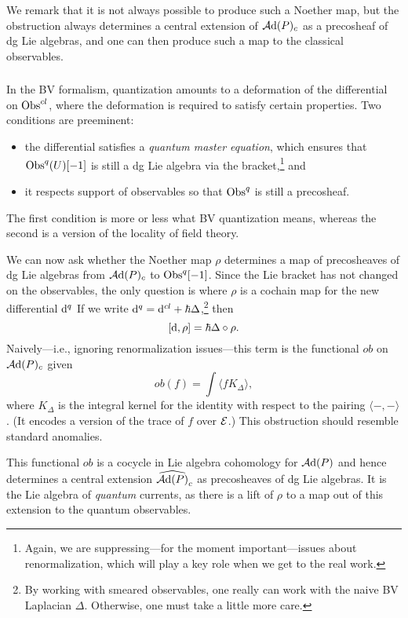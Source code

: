 \begin{rmk}
We remark that it is not always possible to produce such a Noether map,
but the obstruction always determines a central extension of $\mathcal A{\rm d}(P)_c$ as a precosheaf of dg Lie algebras,
and one can then produce such a map to the classical observables.
\end{rmk}

\subsubsection{}

In the BV formalism, quantization amounts to a deformation of the differential on ${\rm Obs}^{cl}$,
where the deformation is required to satisfy certain properties.
Two conditions are preeminent:
\begin{itemize}
\item the differential satisfies a {\em quantum master equation}, which ensures that ${\rm Obs}^q(U)[-1]$ is still a dg Lie algebra via the bracket,\footnote{Again, we are suppressing---for the moment important---issues about renormalization, which will play a key role when we get to the real work.} and
\item it respects support of observables so that ${\rm Obs}^q$ is still a precosheaf.
\end{itemize}
The first condition is more or less what  BV quantization means, 
whereas the second is a version of the locality of field theory.

We can now ask whether the Noether map $\rho$ determines a map of precosheaves of dg Lie algebras from $\mathcal A{\rm d}(P)_c$ to ${\rm Obs}^q[-1]$.
Since the Lie bracket has not changed on the observables, 
the only question is where $\rho$ is a cochain map for the new differential ${\rm d}^q$
If we write ${\rm d}^q = {\rm d}^{cl} + \hbar \Delta$,\footnote{By working with smeared observables, one really can work with the naive BV Laplacian $\Delta$. Otherwise, one must take a little more care.} then 
\[
[{\rm d},\rho] = \hbar \Delta \circ \rho.
\]
Naively---i.e., ignoring renormalization issues---this term is the functional $ob$ on $\mathcal A{\rm d}(P)_c$ given 
\[
ob(f) = \int \langle f K_\Delta \rangle,
\]
where $K_\Delta$ is the integral kernel for the identity with respect to the pairing $\langle-,-\rangle$.
(It encodes a version of the trace of $f$ over $\mathcal E$.)
This obstruction should resemble standard anomalies.

This functional $ob$ is a cocycle in Lie algebra cohomology for $\mathcal A{\rm d}(P)$ and hence determines a central extension $\widehat{\mathcal A{\rm d}(P)}_c$ as precosheaves of dg Lie algebras.
It is the Lie algebra of {\em quantum} currents, as there is a lift of $\rho$ to a map out of this extension to the quantum observables.

